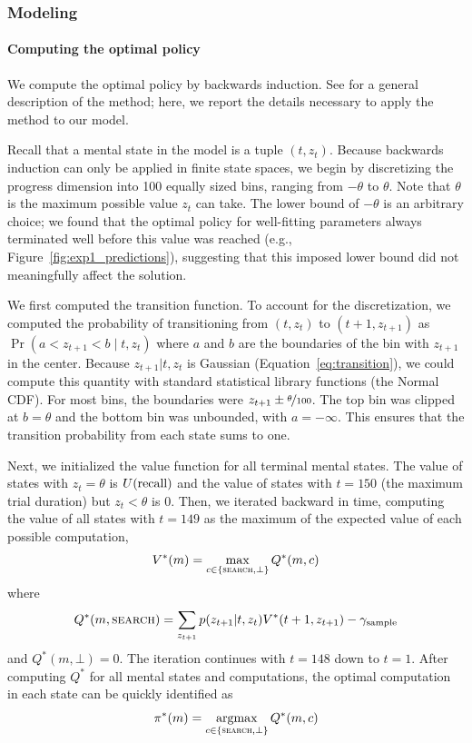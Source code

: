 \subsubsection{Modeling}

\paragraph{Computing the optimal policy}

We compute the optimal policy by backwards induction. See \citet{puterman2014markov} for a general description of the method; here, we report the details necessary to apply the method to our model.

Recall that a mental state in the model is a tuple $(t, z_t)$. Because backwards induction can only be applied in finite state spaces, we begin by discretizing the progress dimension into 100 equally sized bins, ranging from $-\theta$ to $\theta$. Note that $\theta$ is the maximum possible value $z_t$ can take. The lower bound of $-\theta$ is an arbitrary choice; we found that the optimal policy for well-fitting parameters always terminated well before this value was reached (e.g., Figure~\ref{fig:exp1_predictions}), suggesting that this imposed lower bound did not meaningfully affect the solution.

We first computed the transition function. To account for the discretization, we computed the probability of transitioning from $(t, z_t)$ to $(t+1, z_{t+1})$ as $\Pr(a < z_{t+1} < b \mid t, z_t)$ where $a$ and $b$ are the boundaries of the bin with $z_{t+1}$ in the center. Because $z_{t+1}|t,z_t$ is Gaussian (Equation~\ref{eq:transition}), we could compute this quantity with standard statistical library functions (the Normal CDF). For most bins, the boundaries were $z_{t+1} \pm \nicefrac{\theta}{100}$. The top bin was clipped at $b = \theta$ and the bottom bin was unbounded, with $a = -\infty$. This ensures that the transition probability from each state sums to one.

Next, we initialized the value function for all terminal mental states. The value of states with $z_t = \theta$ is $U({\text{recall}})$ and the value of states with $t=150$ (the maximum trial duration) but $z_t < \theta$ is 0. Then, we iterated backward in time, computing the value of all states with $t=149$ as the maximum of the expected value of each possible computation,
%
\begin{equation}
\begin{aligned}
  V^*(m) = \max_{c \in \{\textsc{search}, \bot\}} Q^*(m, c) 
\end{aligned}
\end{equation}
where
%
\begin{equation}
  Q^*(m, \textsc{search}) = \sum_{z_{t+1}} p(z_{t+1} | t, z_t) V^*(t+1, z_{t+1}) - \gamma_\text{sample}
\end{equation}
%
and $Q^*(m, \bot) = 0$. The iteration continues with $t=148$ down to $t=1$. After computing $Q^*$ for all mental states and computations, the optimal computation in each state can be quickly identified as
%
\begin{equation}
  \pi^*(m) = \operatorname*{argmax}_{c \in \{\textsc{search}, \bot\}} Q^*(m, c) 
\end{equation}
%

